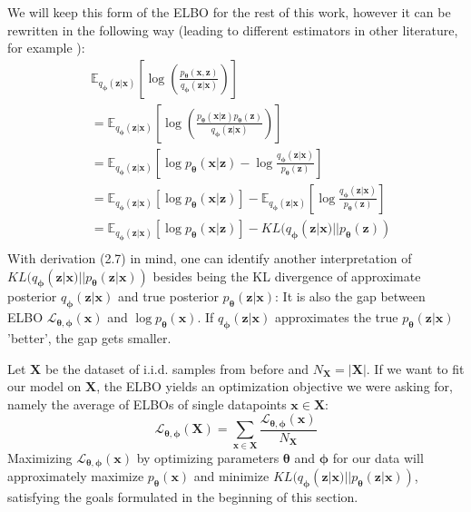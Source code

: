 \documentclass[12pt]{report}
\theoremstyle{definition}
\begin{document}
We will keep this form of the ELBO for the rest of this work, however it can be rewritten in the following way (leading to different estimators in other literature, for example \cite{kingma2}):
\begin{equation}
\begin{split}
& \mathbb{E}_{q_{\pmb{\phi}}(\mathbf{z}|\mathbf{x})}\left[ \log\left(\frac{p_{\pmb{\theta}}(\mathbf{x}, \mathbf{z})}{q_{\pmb{\phi}}(\mathbf{z}|\mathbf{x})}\right) \right] \\
& = \mathbb{E}_{q_{\pmb{\phi}}(\mathbf{z}|\mathbf{x})}\left[ \log\left(\frac{p_{\pmb{\theta}}(\mathbf{x}|\mathbf{z})p_{\pmb{\theta}}(\mathbf{z})}{q_{\pmb{\phi}}(\mathbf{z}|\mathbf{x})}\right) \right] \\
	& = \mathbb{E}_{q_{\pmb{\phi}}(\mathbf{z}|\mathbf{x})}\left[ \log p_{\pmb{\theta}}(\mathbf{x}| \mathbf{z}) - \log \frac{q_{\pmb{\phi}}(\mathbf{z}|\mathbf{x})}{p_{\pmb{\theta}}(\mathbf{z})} \right]	\\
	& = \mathbb{E}_{q_{\pmb{\phi}}(\mathbf{z}|\mathbf{x})}\left[ \log p_{\pmb{\theta}}(\mathbf{x}| \mathbf{z})\right] - \mathbb{E}_{q_{\pmb{\phi}}(\mathbf{z}|\mathbf{x})}\left[\log \frac{q_{\pmb{\phi}}(\mathbf{z}|\mathbf{x})}{p_{\pmb{\theta}}(\mathbf{z})} \right]	\\
	& = \mathbb{E}_{q_{\pmb{\phi}}(\mathbf{z}|\mathbf{x})}\left[ \log p_{\pmb{\theta}}(\mathbf{x}| \mathbf{z})\right] - KL(q_{\pmb{\phi}}(\mathbf{z}|\mathbf{x})||p_{\pmb{\theta}}(\mathbf{z}))\\
\end{split}
\end{equation}
With derivation (2.7) in mind, one can identify another interpretation of $KL(q_{\pmb{\phi}}(\mathbf{z}|\mathbf{x}) || p_{\pmb{\theta}}(\mathbf{z}|\mathbf{x}))$ besides being the KL divergence of approximate posterior $q_{\pmb{\phi}}(\mathbf{z}|\mathbf{x})$ and true posterior $p_{\pmb{\theta}}(\mathbf{z}| \mathbf{x})$: It is also the gap between ELBO $\mathcal{L}_{\pmb{\theta}, \pmb{\phi}}(\mathbf{x})$ and $\log p_{\pmb{\theta}}(\mathbf{x})$. If $q_{\pmb{\phi}}(\mathbf{z}|\mathbf{x})$ approximates the true $p_{\pmb{\theta}}(\mathbf{z}|\mathbf{x})$ 'better', the gap gets smaller.

Let $\mathbf{X}$ be the dataset of i.i.d. samples from before and $N_{\mathbf{X}} = |\mathbf{X}|$. If we want to fit our model on $\mathbf{X}$, the ELBO yields an optimization objective we were asking for, namely the average of ELBOs of single datapoints $\mathbf{x} \in \mathbf{X}$:
\begin{equation}
	\mathcal{L}_{\pmb{\theta}, \pmb{\phi}}(\mathbf{X}) = \sum_{\mathbf{x} \in \mathbf{X}} \frac{\mathcal{L}_{\pmb{\theta}, \pmb{\phi}}(\mathbf{x})}{N_{\mathbf{X}}}
\end{equation}
Maximizing $\mathcal{L}_{\pmb{\theta}, \pmb{\phi}}(\mathbf{x})$ by optimizing parameters $\pmb{\theta}$ and $\pmb{\phi}$ for our data will approximately maximize $p_{\pmb{\theta}}(\mathbf{x})$ and minimize $KL(q_{\pmb{\phi}}(\mathbf{z}|\mathbf{x}) || p_{\pmb{\theta}}(\mathbf{z}| \mathbf{x}))$, satisfying the goals formulated in the beginning of this section.
\end{document}
